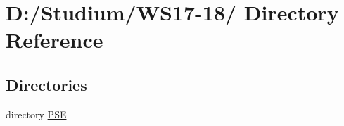 \hypertarget{dir_D_3A_2FStudium_2FWS17_2D18_2F}{
\section{D:/Studium/WS17-18/ Directory Reference}
\label{dir_D_3A_2FStudium_2FWS17_2D18_2F}
}


\subsection*{Directories}
\begin{CompactItemize}
\item 
directory \hyperlink{dir_D_3A_2FStudium_2FWS17_2D18_2FPSE_2F}{PSE}
\end{CompactItemize}
